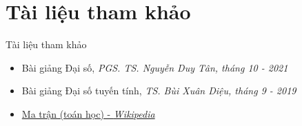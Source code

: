\documentclass[pdf,10pt]{beamer}
\begin{document}
\section*{Tài liệu tham khảo}
\begin{frame}{Tài liệu tham khảo}
	\begin{itemize}
		\item Bài giảng Đại số, \textit{PGS. TS. Nguyễn Duy Tân, tháng 10 - 2021}
		\item Bài giảng Đại số tuyến tính, \textit{TS. Bùi Xuân Diệu, tháng 9 - 2019}
		\item \href{https://vi.wikipedia.org/wiki/Ma_tr\%E1\%BA\%ADn_(to\%C3\%A1n_h\%E1\%BB\%8Dc)}{Ma trận (toán học) - \textit{Wikipedia}}
	\end{itemize}
\end{frame}
\end{document}
